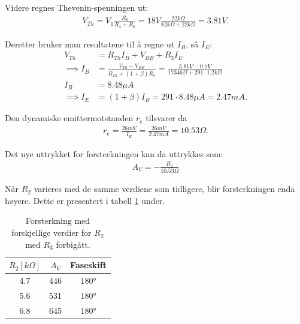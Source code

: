             Videre regnes Thevenin-spenningen ut:
            \begin{align*}
                V_{Th} = V_1 \frac{R_6}{R_4 + R_6} = 18V \frac{22k\Omega}{82k\Omega + 22k\Omega} = 3.81V.
            \end{align*}

            Deretter bruker man resultatene til å regne ut $I_B$, så $I_E$:
            \begin{align*}
                V_{Th} &= R_{Th}I_B + V_{BE} + R_3 I_E \\
                \implies I_B &= \frac{V_{Th} - V_{BE}}{R_{Th} + (1 + \beta)R_3} = \frac{3.81V - 0.7V}{17346\Omega +291\cdot 1.2k\Omega} \\
                I_B &= 8.48\mu A\\
                \implies I_E &= (1 + \beta)I_B = 291\cdot 8.48\mu A = 2.47mA. 
            \end{align*}

            Den dynamiske emittermotstanden $r_e$ tilsvarer da
            \begin{align*}
                r_e = \frac{26mV}{I_E} = \frac{26mV}{2.47mA} = 10.53\Omega.
            \end{align*}

            Det nye uttrykket for forsterkningen kan da uttrykkes som:
            \begin{align*}
                A_V = -\frac{R_2}{10.53\Omega}
            \end{align*}

            Når $R_2$ varieres med de samme verdiene som tidligere, blir forsterkningen enda høyere. Dette er presentert i tabell \ref{tab:forsterkning2} under.
            \begin{table}[h]
                \centering
                \caption{Forsterkning med forskjellige verdier for $R_2$ med $R_3$ forbigått.}
                \label{tab:forsterkning2}
                \begin{tabular}{|c|c|c|}
                    \hline
                    \rowcolor[gray]{0.9}
                    \textbf{$R_2 [k\Omega]$} & \textbf{$A_V$} & \textbf{Faseskift} \\ \hline
                    4.7                      & 446           & $\ang{180}$ \\ \hline
                    5.6                      & 531           & $\ang{180}$ \\ \hline
                    6.8                      & 645           & $\ang{180}$ \\ \hline
                \end{tabular}
            \end{table}